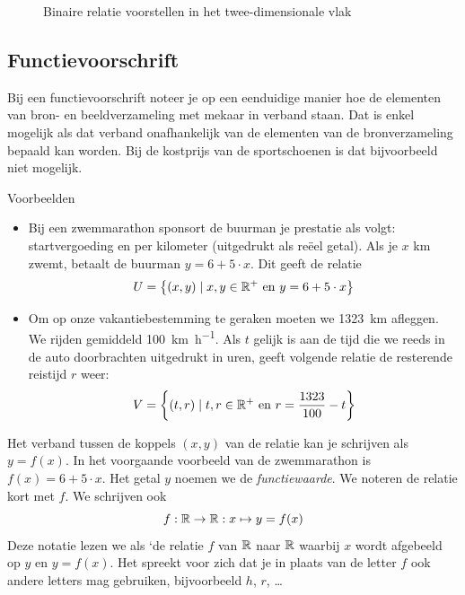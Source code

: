 \begin{figure}[htbp]
\centering
{}\qquad
{}
\caption{Binaire relatie voorstellen in het twee-dimensionale vlak}
\end{figure}


\subsection{Functievoorschrift}
\label{subsec:voorschrift}
Bij een functievoorschrift noteer je op een eenduidige manier hoe de elementen van bron- en beeldverzameling met mekaar in verband staan. Dat is enkel mogelijk als dat verband onafhankelijk van de elementen van de bronverzameling  bepaald kan worden. Bij de kostprijs van de sportschoenen is dat bijvoorbeeld niet mogelijk.

Voorbeelden
\begin{itemize}
\item Bij een zwemmarathon sponsort de buurman je prestatie als volgt:  startvergoeding en  per kilometer (uitgedrukt als reëel getal).  Als je  $x$ \si{\kilo\meter} zwemt, betaalt de buurman  $y=6+5\cdot x$. Dit geeft de relatie
\[
U=\left\{(x,y)\mid x,y\in\mathbb{R}^+ \mathrm{~en~} y=6+5\cdot x\right\}
\]
\item Om op onze vakantiebestemming te geraken moeten we \SI{1323}{\km} afleggen. We rijden gemiddeld \SI{100}{\km\per\hour}. Als $t$ gelijk is aan de tijd  die we reeds in de auto doorbrachten uitgedrukt in uren, geeft volgende relatie  de resterende reistijd $r$ weer:
\[
V=\left \{(t,r)\mid t,r\in \mathbb{R}^+\mathrm{~en~} r=\frac{1323}{100}-t\right \}
\]
\end{itemize}


Het verband tussen de koppels $(x,y)$ van de relatie kan je schrijven als $y=f(x)$. In het voorgaande voorbeeld 
van de zwemmarathon is $f(x)=6+5\cdot x$.  Het getal $y$ noemen we de \emph{functiewaarde}. We noteren de relatie kort met $f$.  We schrijven ook
\[
f: \mathbb{R}\to\mathbb{R}: x\mapsto y =f(x)
\]
Deze notatie lezen we als `de relatie $f$ van $\mathbb{R}$ naar $\mathbb{R}$ waarbij $x$ wordt afgebeeld op $y$ en $y=f(x)$. Het spreekt voor zich dat je in plaats van de letter $f$ ook andere letters mag gebruiken, bijvoorbeeld $h$, $r$, \dots

